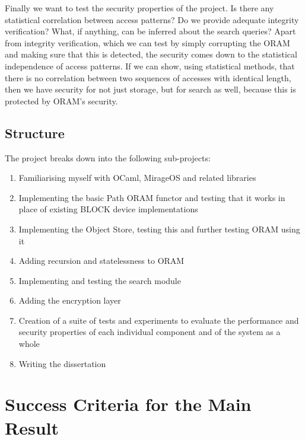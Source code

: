\documentclass[12pt,a4paper,twoside]{article}
\begin{document}
Finally we want to test the security properties of the project. Is there any statistical correlation between access patterns? Do we provide adequate integrity verification? What, if anything, can be inferred about the search queries? Apart from integrity verification, which we can test by simply corrupting the ORAM and making sure that this is detected, the security comes down to the statistical independence of access patterns. If we can show, using statistical methods, that there is no correlation between two sequences of accesses with identical length, then we have security for not just storage, but for search as well, because this is protected by ORAM's security.

\subsection*{Structure}

The project breaks down into the following sub-projects:

\begin{enumerate}

\item Familiarising myself with OCaml, MirageOS and related libraries

\item Implementing the basic Path ORAM functor and testing that it works in place of existing BLOCK device implementations

\item Implementing the Object Store, testing this and further testing ORAM using it

\item Adding recursion and statelessness to ORAM 

\item Implementing and testing the search module

\item Adding the encryption layer

\item Creation of a suite of tests and experiments to evaluate the performance and security properties of each individual component and of the system as a whole

\item Writing the dissertation

\end{enumerate}

\section*{Success Criteria for the Main Result}
\end{document}
